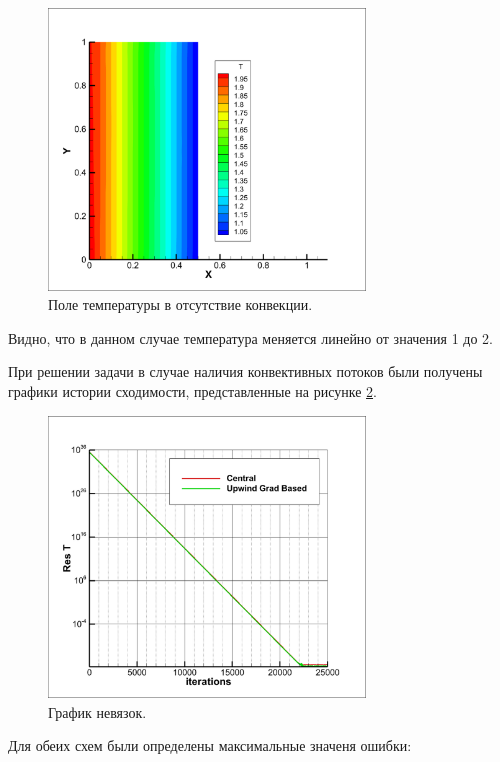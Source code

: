 \begin{figure}[H]
    \centering
    \includegraphics[width=0.75\textwidth]{img/02.png}
    \caption{Поле температуры в отсутствие конвекции.}
    \label{fig:02}
\end{figure}

Видно, что в данном случае температура меняется линейно от значения 1 до 2.

При решении задачи в случае наличия конвективных потоков были получены графики истории сходимости, представленные на рисунке \ref{fig:03}.

\begin{figure}[H]
    \centering
    \includegraphics[width=0.75\textwidth]{img/03.png}
    \caption{График невязок.}
    \label{fig:03}
\end{figure}


Для обеих схем были определены максимальные значеня ошибки:

